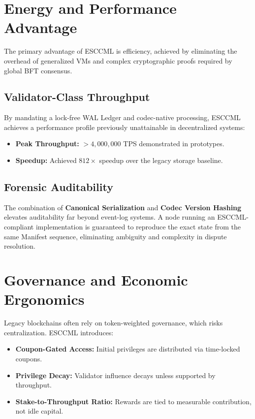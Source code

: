 \documentclass[11pt, a4paper]{article}
\begin{document}
\section{Energy and Performance Advantage}
The primary advantage of ESCCML is efficiency, achieved by eliminating the overhead of generalized
VMs and complex cryptographic proofs required by global BFT consensus.

\subsection{Validator-Class Throughput}
By mandating a lock-free WAL Ledger and codec-native processing, ESCCML achieves a performance
profile previously unattainable in decentralized systems:
\begin{itemize}
    \item \textbf{Peak Throughput:} $> 4,000,000$ TPS demonstrated in prototypes.
    \item \textbf{Speedup:} Achieved $812\times$ speedup over the legacy storage baseline.
\end{itemize}

\subsection{Forensic Auditability}
The combination of \textbf{Canonical Serialization} and \textbf{Codec Version Hashing} elevates
auditability far beyond event-log systems. A node running an ESCCML-compliant implementation is
guaranteed to reproduce the exact state from the same Manifest sequence, eliminating ambiguity
and complexity in dispute resolution.

\section{Governance and Economic Ergonomics}
Legacy blockchains often rely on token-weighted governance, which risks centralization. ESCCML
introduces:
\begin{itemize}
    \item \textbf{Coupon-Gated Access:} Initial privileges are distributed via time-locked coupons.
    \item \textbf{Privilege Decay:} Validator influence decays unless supported by throughput.
    \item \textbf{Stake-to-Throughput Ratio:} Rewards are tied to measurable contribution, not idle capital.
\end{itemize}
\end{document}
